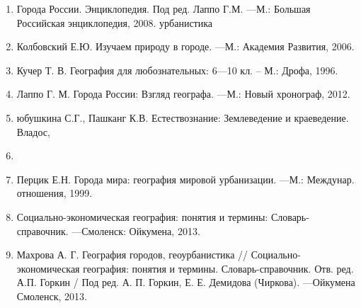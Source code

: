 \documentclass[
  11pt,
  russian,
]{book}
\providecommand{\tightlist}{%
  \setlength{\itemsep}{0pt}\setlength{\parskip}{0pt}}
\begin{document}
\begin{enumerate}
\def\labelenumi{\arabic{enumi}.}
\tightlist
\item
  Города России. Энциклопедия. Под ред. Лаппо Г.М. ---М.: Большая
  Российская энциклопедия, 2008. урбанистика
\item
  Колбовский Е.Ю. Изучаем природу в городе. ---М.: Академия Развития, 2006.
\item
  Кучер Т. В. География для любознательных: 6---10 кл. -- М.: Дрофа, 1996.
\item
  Лаппо Г. М. Города России: Взгляд географа. ---М.: Новый хронограф, 2012.
\item
  юбушкина С.Г., Пашканг К.В. Естествознание: Землеведение и краеведение. Владос,
\item
\item
  Перцик Е.Н. Города мира: география мировой урбанизации. ---М.: Междунар. отношения, 1999.
\item
  Социально-экономическая география: понятия и термины: Словарь-справочник. ---Смоленск: Ойкумена, 2013.
\item
  Махрова А. Г. География городов, геоурбанистика // Социально-экономическая география: понятия и термины. Словарь-справочник.
  Отв. ред. А.П. Горкин / Под ред. А. П. Горкин, Е. Е. Демидова (Чиркова). ---Ойкумена Смоленск, 2013.
\end{enumerate}

  
\end{document}
